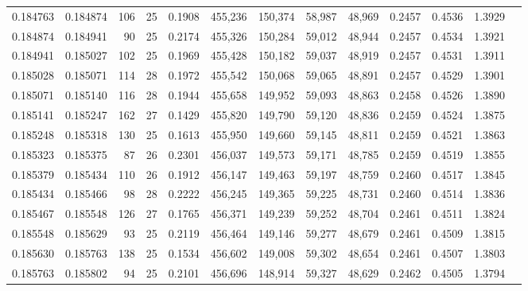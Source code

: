 \begin{tabular}{rrrrrrrrrrrrr}
0.184763 & 0.184874 & 106 &  25 &                                     0.1908 & 455,236 & 150,374 &  58,987 &  48,969 & 0.2457 & 0.4536 & 1.3929 \\
0.184874 & 0.184941 &  90 &  25 &                                     0.2174 & 455,326 & 150,284 &  59,012 &  48,944 & 0.2457 & 0.4534 & 1.3921 \\
0.184941 & 0.185027 & 102 &  25 &                                     0.1969 & 455,428 & 150,182 &  59,037 &  48,919 & 0.2457 & 0.4531 & 1.3911 \\
0.185028 & 0.185071 & 114 &  28 &                                     0.1972 & 455,542 & 150,068 &  59,065 &  48,891 & 0.2457 & 0.4529 & 1.3901 \\
0.185071 & 0.185140 & 116 &  28 &                                     0.1944 & 455,658 & 149,952 &  59,093 &  48,863 & 0.2458 & 0.4526 & 1.3890 \\
0.185141 & 0.185247 & 162 &  27 &                                     0.1429 & 455,820 & 149,790 &  59,120 &  48,836 & 0.2459 & 0.4524 & 1.3875 \\
0.185248 & 0.185318 & 130 &  25 &                                     0.1613 & 455,950 & 149,660 &  59,145 &  48,811 & 0.2459 & 0.4521 & 1.3863 \\
0.185323 & 0.185375 &  87 &  26 &                                     0.2301 & 456,037 & 149,573 &  59,171 &  48,785 & 0.2459 & 0.4519 & 1.3855 \\
0.185379 & 0.185434 & 110 &  26 &                                     0.1912 & 456,147 & 149,463 &  59,197 &  48,759 & 0.2460 & 0.4517 & 1.3845 \\
0.185434 & 0.185466 &  98 &  28 &                                     0.2222 & 456,245 & 149,365 &  59,225 &  48,731 & 0.2460 & 0.4514 & 1.3836 \\
0.185467 & 0.185548 & 126 &  27 &                                     0.1765 & 456,371 & 149,239 &  59,252 &  48,704 & 0.2461 & 0.4511 & 1.3824 \\
0.185548 & 0.185629 &  93 &  25 &                                     0.2119 & 456,464 & 149,146 &  59,277 &  48,679 & 0.2461 & 0.4509 & 1.3815 \\
0.185630 & 0.185763 & 138 &  25 &                                     0.1534 & 456,602 & 149,008 &  59,302 &  48,654 & 0.2461 & 0.4507 & 1.3803 \\
0.185763 & 0.185802 &  94 &  25 &                                     0.2101 & 456,696 & 148,914 &  59,327 &  48,629 & 0.2462 & 0.4505 & 1.3794 \\

\end{tabular}
